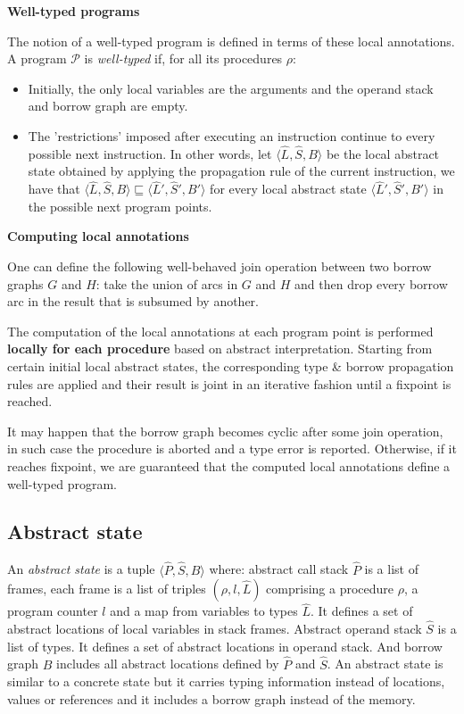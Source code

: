 \vspace{0.1cm}

\noindent\textbf{Well-typed programs}

The notion of a well-typed program is defined in terms of these local annotations. A program $\mathcal{P}$ is \textit{well-typed} if, for all its procedures $\rho$:
\begin{itemize}
    \itemsep 0em
    \item Initially, the only local variables are the arguments and the operand stack and borrow graph are empty.
    \item The 'restrictions' imposed after executing an instruction continue to every possible next instruction. In other words, let $\langle \hat{L},\hat{S},B \rangle$ be the local abstract state obtained by applying the propagation rule of the current instruction, we have that $\langle \hat{L},\hat{S},B \rangle \sqsubseteq \langle \hat{L}',\hat{S}',B' \rangle$ for every local abstract state $\langle \hat{L}',\hat{S}',B' \rangle$ in the possible next program points.
\end{itemize}

\noindent\textbf{Computing local annotations}

One can define the following well-behaved join operation between two borrow graphs $G$ and $H$: take the union of arcs in $G$ and $H$ and then drop every borrow arc in the result that is subsumed by another.

The computation of the local annotations at each program point is performed \textbf{locally for each procedure} based on abstract interpretation. Starting from certain initial local abstract states, the corresponding type \& borrow propagation rules are applied and their result is joint in an iterative fashion until a fixpoint is reached.

It may happen that the borrow graph becomes cyclic after some join operation, in such case the procedure is aborted and a type error is reported. Otherwise, if it reaches fixpoint, we are guaranteed that the computed local annotations define a well-typed program.

\subsection{Abstract state}

An \textit{abstract state} is a tuple $\langle \hat{P},\hat{S},B \rangle$ where: abstract call stack $\hat{P}$ is a list of frames, each frame is a list of triples $(\rho, l, \hat{L})$ comprising a procedure $\rho$, a program counter $l$ and a map from variables to types $\hat{L}$. It defines a set of abstract locations of local variables in stack frames. Abstract operand stack $\hat{S}$ is a list of types. It defines a set of abstract locations in operand stack. And borrow graph $B$ includes all abstract locations defined by $\hat{P}$ and $\hat{S}$. An abstract state is similar to a concrete state but it carries typing information instead of locations, values or references and it includes a borrow graph instead of the memory.

